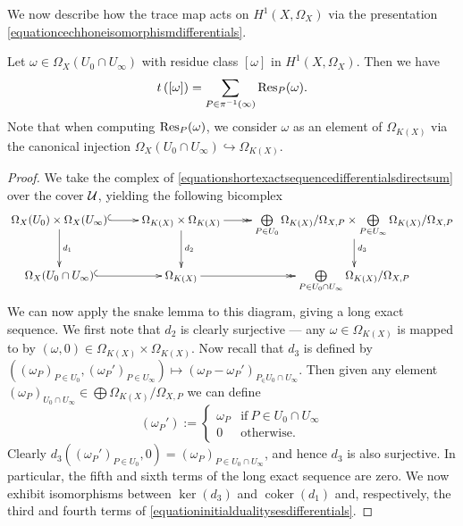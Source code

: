 We now describe how the trace map acts on $H^1(X,\Omega_X)$ via the presentation \eqref{equationcechhoneisomorphismdifferentials}.
    \begin{lem}\label{lemmatracemaplemma}
    Let $ \omega \in \Omega_X(U_0 \cap U_\infty)$ with residue class $[\omega]$ in $H^1(X,\Omega_X)$.
    Then we have
        \[
        t\left([ \omega ]\right) = \sum_{P \in \pi^{-1}(\infty)}\operatorname{Res}_P(\omega).
        \]
    Note that when computing $\operatorname{Res}_P(\omega)$, we consider $\omega$ as an element of $\Omega_{K(X)}$ via the canonical injection $\Omega_X(U_0 \cap U_\infty) \hookrightarrow \Omega_{K(X)}$.
    \end{lem}
    \begin{proof}
    We take the \cech complex of \eqref{equationshortexactsequencedifferentialsdirectsum} over the cover ${\mathcal U}$, yielding the following bicomplex
        \begin{equation}\label{equationdualitycommutativediagramdifferentials}
        \xymatrix{\Omega_X(U_0)\times\Omega_X(U_\infty) \ar@{^{(}->}[r] \ar[d]^{d_1} & \Omega_{K(X)} \times \Omega_{K(X)} \ar[d]^{d_2} \ar@{->>}[r] & \bigoplus \limits_{P \in U_0} \Omega_{K(X)}/\Omega_{X,P} \times \bigoplus \limits_{P \in U_\infty} \Omega_{K(X)}/\Omega_{X,P} \ar[d]^{d_3} \\
        \Omega_X(U_0 \cap U_\infty) \ar@{^{(}->}[r]  & \Omega_{K(X)} \ar@{->>}[r] & \bigoplus \limits_{P\in U_0 \cap U_\infty} \Omega_{K(X)}/\Omega_{X,P} }
        \end{equation}
    We can now apply the snake lemma to this diagram, giving a long exact sequence.
    We first note that $d_2$ is clearly surjective --- any $\omega \in \Omega_{K(X)}$ is mapped to by $(\omega, 0) \in \Omega_{K(X)} \times \Omega_{K(X)}$.
    Now recall that $d_3$ is defined by $((\omega_P)_{P \in U_0}, (\omega_P')_{P \in U_\infty}) \mapsto (\omega_P - \omega_P')_{P_ \in U_0 \cap U_\infty}$.
    Then given any element $(\omega_P)_{U_0 \cap U_\infty} \in \bigoplus \Omega_{K(X)}/\Omega_{X,P}$ we can define
        \[
        (\omega_P') := 
            \begin{cases}
            \omega_P & \text{if}\ P \in U_0 \cap U_\infty \\
            0 & \text{otherwise.}
            \end{cases}
        \]  
    Clearly $d_3((\omega_P')_{P \in U_0}, 0) = (\omega_P)_{P \in U_0 \cap U_\infty}$, and hence $d_3$ is also surjective.
    In particular, the fifth and sixth terms of the long exact sequence are zero.
    We now exhibit isomorphisms between $\ker(d_3)$ and $\operatorname{coker}(d_1)$ and, respectively, the third and fourth terms of \eqref{equationinitialdualitysesdifferentials}.

\end{proof}
